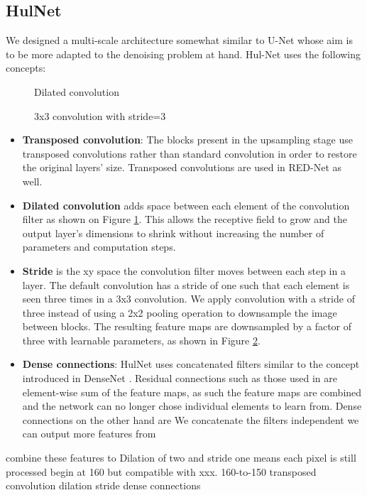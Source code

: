 \subsection{HulNet}
We designed a multi-scale architecture somewhat similar to U-Net whose aim is to be more adapted to the denoising problem at hand. Hul-Net uses the following concepts:
\begin{figure}
  \begin{center}
    \caption{Dilated convolution}
    \label{fig:dilated}
  \end{center}
\end{figure}
\begin{figure}

  \begin{center}
      
    \caption{3x3 convolution with stride=3}
    \label{fig:str3}
  \end{center}
\end{figure}
\begin{itemize}
  \item \textbf{Transposed convolution}: The blocks present in the upsampling stage use transposed convolutions rather than standard convolution in order to restore the original layers' size. Transposed convolutions are used in RED-Net as well.
  \item \textbf{Dilated convolution} adds space between each element of the convolution filter as shown on Figure \ref{fig:dilated}. This allows the receptive field to grow and the output layer's dimensions to shrink without increasing the number of parameters and computation steps.
  \item \textbf{Stride} is the xy space the convolution filter moves between each step in a layer. The default convolution has a stride of one such that each element is seen three times in a 3x3 convolution. We apply convolution with a stride of three instead of using a 2x2 pooling operation to downsample the image between blocks. The resulting feature maps are downsampled by a factor of three with learnable parameters, as shown in Figure \ref{fig:str3}.
  \item \textbf{Dense connections}: HulNet uses concatenated filters similar to the concept introduced in DenseNet \cite{densenet}. Residual connections such as those used in \cite{rednet}\cite{unet} are element-wise sum of the feature maps, as such the feature maps are combined and the network can no longer chose individual elements to learn from. Dense connections on the other hand are 
  We concatenate the filters 
  independent
  we can output more features from 
\end{itemize}
combine these features to 
Dilation of two and stride one means each pixel is still processed
begin at 160 but compatible with xxx. 160-to-150
transposed convolution
dilation
stride
dense connections
